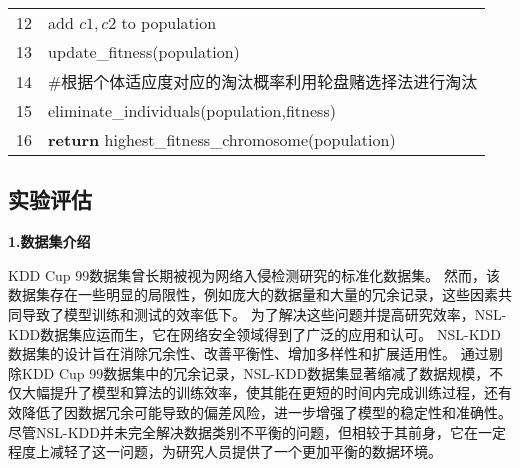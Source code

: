 \begin{table}[h]
\begin{tabularx}{1.0\textwidth}{cl}
		12 & \quad add $c1, c2$ to population                                               \\
		13 & \quad update\_fitness(population)                                              \\
		14 & \quad \#根据个体适应度对应的淘汰概率利用轮盘赌选择法进行淘汰                   \\
		15 & \quad eliminate\_individuals(population,fitness)                               \\
		16 & \textbf{return} highest\_fitness\_chromosome(population)                       \\
		\bottomrule
	\end{tabularx}
\end{table}


\subsection{实验评估}
\textbf{1.数据集介绍}\par
KDD Cup 99数据集\cite{tavallaee2009detailed}曾长期被视为网络入侵检测研究的标准化数据集。
然而，该数据集存在一些明显的局限性，例如庞大的数据量和大量的冗余记录，这些因素共同导致了模型训练和测试的效率低下。
为了解决这些问题并提高研究效率，NSL-KDD数据集\cite{revathi2013detailed}应运而生，它在网络安全领域得到了广泛的应用和认可。
NSL-KDD数据集的设计旨在消除冗余性、改善平衡性、增加多样性和扩展适用性。
通过剔除KDD Cup 99数据集中的冗余记录，NSL-KDD数据集显著缩减了数据规模，不仅大幅提升了模型和算法的训练效率，使其能在更短的时间内完成训练过程，还有效降低了因数据冗余可能导致的偏差风险，进一步增强了模型的稳定性和准确性。
尽管NSL-KDD并未完全解决数据类别不平衡的问题，但相较于其前身，它在一定程度上减轻了这一问题，为研究人员提供了一个更加平衡的数据环境。\par

